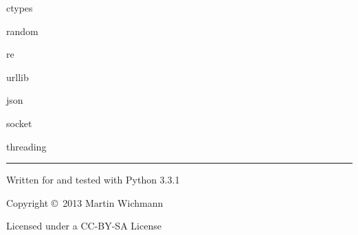 \begin{multicols}{3}
    \begin{cschapter}{ctypes}
        \csitem{}{}
    \end{cschapter}

    \begin{cschapter}{random}
        \csitem{}{}
    \end{cschapter}

    \begin{cschapter}{re}
        \csitem{}{}
    \end{cschapter}

    \begin{cschapter}{urllib}
        \csitem{}{}
    \end{cschapter}

    \begin{cschapter}{json}
        \csitem{}{}
    \end{cschapter}

    \begin{cschapter}{socket}
        \csitem{}{}
    \end{cschapter}

    \begin{cschapter}{threading}
        \csitem{}{}
    \end{cschapter}


    \rule{0.3\linewidth}{0.25pt}
    \scriptsize

    Written for and tested with Python 3.3.1

    Copyright \copyright\ 2013 Martin Wichmann

    Licensed under a CC-BY-SA License

\end{multicols}




